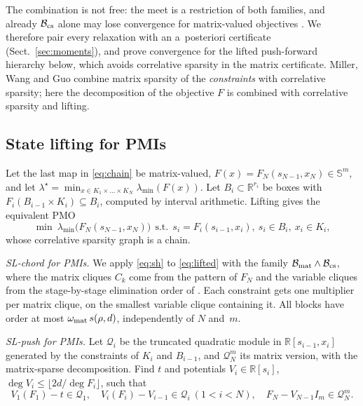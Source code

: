 \documentclass[smallextended]{svjour3}
\newcommand{\R}{\mathbb{R}}
\newcommand{\Sym}{\mathbb{S}}
\newcommand{\cB}{\mathcal{B}}
\newcommand{\cQ}{\mathcal{Q}}
\newcommand{\lmin}{\lambda_{\min}}
\newcommand{\sz}[2]{s(#1,#2)}
\begin{document}
The combination is not free: the meet is a restriction of both families, and
already $\cB_{\rm cs}$ alone may lose convergence for matrix-valued
objectives \cite[Ex.~5.1]{MillerWangGuo2026}. We therefore pair every
relaxation with an a~posteriori certificate (Sect.~\ref{sec:moments}), and
prove convergence for the lifted push-forward hierarchy below, which avoids
correlative sparsity in the matrix certificate. Miller, Wang and Guo combine
matrix sparsity of the \emph{constraints} with correlative sparsity; here
the decomposition of the objective $F$ is combined with correlative
sparsity and lifting.

\subsection{State lifting for PMIs}
\label{sec:lifting}

Let the last map in \eqref{eq:chain} be matrix-valued,
$F(x)=F_N(s_{N-1},x_N)\in\Sym^m$, and let $\lambda^\star=\min_{x\in
K_1\times\dots\times K_N}\lmin(F(x))$. Let $B_i\subset\R^{r_i}$ be boxes
with $F_i(B_{i-1}\times K_i)\subseteq B_i$, computed by interval
arithmetic. Lifting gives the equivalent PMO
\begin{equation}
\label{eq:lifted}
\min\ \lmin\bigl(F_N(s_{N-1},x_N)\bigr)\ \ \text{s.t.}\ \
s_i=F_i(s_{i-1},x_i),\ s_i\in B_i,\ x_i\in K_i,
\end{equation}
whose correlative sparsity graph is a chain.

\emph{SL-chord for PMIs.} We apply \eqref{eq:sh} to \eqref{eq:lifted} with
the family $\cB_{\rm mat}\wedge\cB_{\rm cs}$, where the matrix cliques $C_k$
come from the pattern of $F_N$ and the variable cliques from the
stage-by-stage elimination order of \cite{BGHK2025,BGHK2026}. Each
constraint gets one multiplier per matrix clique, on the smallest variable
clique containing it. All blocks have order at most $\omega_{\rm
mat}\,\sz{\rho}{d}$, independently of $N$ and~$m$.

\emph{SL-push for PMIs.} Let $\cQ_i$ be the truncated quadratic module in
$\R[s_{i-1},x_i]$ generated by the constraints of $K_i$ and $B_{i-1}$, and
$\cQ^m_N$ its matrix version, with the matrix-sparse decomposition. Find
$t$ and potentials $V_i\in\R[s_i]$, $\deg V_i\le\lfloor 2d/\deg F_i
\rfloor$, such that
\begin{equation}
\label{eq:push}
V_1(F_1)-t\in\cQ_1,\quad V_i(F_i)-V_{i-1}\in\cQ_i\ (1<i<N),\quad
F_N-V_{N-1}I_m\in\cQ^m_N .
\end{equation}
\end{document}
